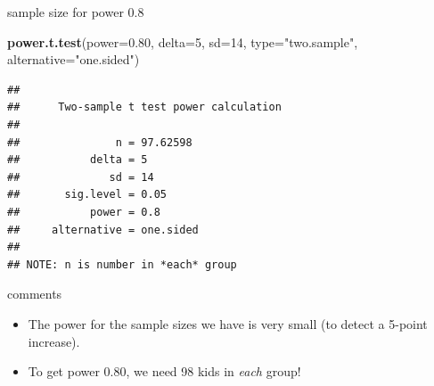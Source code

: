 \documentclass[ignorenonframetext,]{beamer}
\newenvironment{Shaded}{\begin{snugshade}}{\end{snugshade}}
\newcommand{\DataTypeTok}[1]{\textcolor[rgb]{0.13,0.29,0.53}{#1}}
\newcommand{\DecValTok}[1]{\textcolor[rgb]{0.00,0.00,0.81}{#1}}
\newcommand{\FloatTok}[1]{\textcolor[rgb]{0.00,0.00,0.81}{#1}}
\newcommand{\KeywordTok}[1]{\textcolor[rgb]{0.13,0.29,0.53}{\textbf{#1}}}
\newcommand{\NormalTok}[1]{#1}
\newcommand{\StringTok}[1]{\textcolor[rgb]{0.31,0.60,0.02}{#1}}
\providecommand{\tightlist}{%
  \setlength{\itemsep}{0pt}\setlength{\parskip}{0pt}}
\begin{document}
\begin{frame}[fragile]{sample size for power 0.8}
\protect\hypertarget{sample-size-for-power-0.8}{}

\begin{Shaded}
\begin{Highlighting}[]
\KeywordTok{power.t.test}\NormalTok{(}\DataTypeTok{power=}\FloatTok{0.80}\NormalTok{, }\DataTypeTok{delta=}\DecValTok{5}\NormalTok{, }\DataTypeTok{sd=}\DecValTok{14}\NormalTok{, }\DataTypeTok{type=}\StringTok{"two.sample"}\NormalTok{, }
             \DataTypeTok{alternative=}\StringTok{"one.sided"}\NormalTok{)}
\end{Highlighting}
\end{Shaded}

\begin{verbatim}
## 
##      Two-sample t test power calculation 
## 
##               n = 97.62598
##           delta = 5
##              sd = 14
##       sig.level = 0.05
##           power = 0.8
##     alternative = one.sided
## 
## NOTE: n is number in *each* group
\end{verbatim}

\end{frame}

\begin{frame}{comments}
\protect\hypertarget{comments-4}{}

\begin{itemize}
\tightlist
\item
  The power for the sample sizes we have is very small (to detect a
  5-point increase).
\item
  To get power 0.80, we need 98 kids in \emph{each} group!
\end{itemize}

\end{frame}
\end{document}
